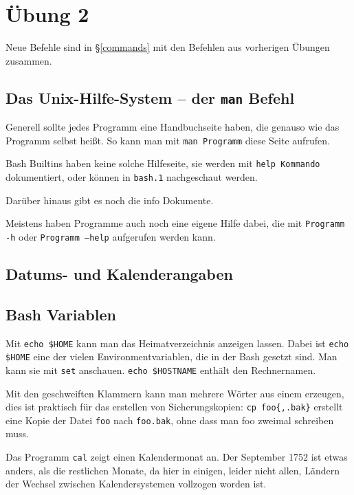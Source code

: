 \chapter{Übung 2}

Neue Befehle sind in §\ref{commands} mit den Befehlen aus vorherigen Übungen zusammen.

\section{Das Unix-Hilfe-System -- der \texttt{man} Befehl}

Generell sollte jedes Programm eine Handbuchseite haben, die genauso wie das Programm selbst heißt. So kann man mit \texttt{man Programm} diese Seite aufrufen.

Bash Builtins haben keine solche Hilfeseite, sie werden mit \texttt{help Kommando} dokumentiert, oder können in \texttt{bash.1} nachgeschaut werden.

Darüber hinaus gibt es noch die info Dokumente.

Meistens haben Programme auch noch eine eigene Hilfe dabei, die mit \texttt{Programm -h} oder \texttt{Programm --help} aufgerufen werden kann.

\section{Datums- und Kalenderangaben}

\section{Bash Variablen}

Mit \texttt{echo \${HOME}} kann man das Heimatverzeichnis anzeigen lassen. Dabei ist \texttt{echo \$HOME} eine der vielen Environmentvariablen, die in der Bash gesetzt sind. Man kann sie mit \texttt{set} anschauen. \texttt{echo \${HOSTNAME}} enthält den Rechnernamen.

Mit den geschweiften Klammern kann man mehrere Wörter aus einem erzeugen, dies ist praktisch für das erstellen von Sicherungskopien: \verb#cp foo{,.bak}# erstellt eine Kopie der Datei \texttt{foo} nach \texttt{foo.bak}, ohne dass man foo zweimal schreiben muss.

Das Programm \texttt{cal} zeigt einen Kalendermonat an. Der September 1752 ist etwas anders, als die restlichen Monate, da hier in einigen, leider nicht allen, Ländern der Wechsel zwischen Kalendersystemen vollzogen worden ist.

